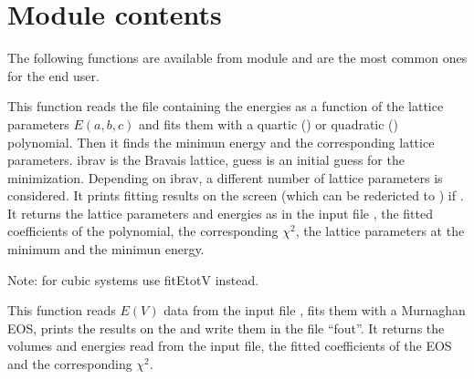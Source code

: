 \documentclass[letterpaper,10pt,english]{sphinxmanual}
\begin{document}
\section{Module contents}
\label{pyqha:module-contents}
The following functions are available from  module and are the most common ones for the end user.
\label{pyqha:module-pyqha.fitEtot}

\begin{fulllineitems}
\label{pyqha:pyqha.fitEtot.fitEtot}
This function reads the file  containing the energies as a function
of the lattice parameters \(E(a,b,c)\) and fits them with a quartic () or 
quadratic () polynomial. Then it finds the minimun energy
and the corresponding lattice parameters. 
ibrav is the Bravais lattice, guess is an initial guess for the minimization.
Depending on ibrav, a different number of lattice parameters is considered.
It prints fitting results on the screen (which can be redericted to )
if .
It returns the lattice parameters and energies as in the input file ,
the fitted coefficients of the polynomial, the corresponding \(\chi^2\),
the lattice parameters at the minimum and the minimun energy.

Note: for cubic systems use fitEtotV instead.

\end{fulllineitems}


\begin{fulllineitems}
\label{pyqha:pyqha.fitEtot.fitEtotV}
This function reads \(E(V)\) data from the input file , fits them with a Murnaghan EOS,
prints the results on the  and write them in the file ``fout''.
It returns the volumes and energies read from the input file, the fitted coefficients 
of the EOS and the corresponding \(\chi^2\).

\end{fulllineitems}
\end{document}
